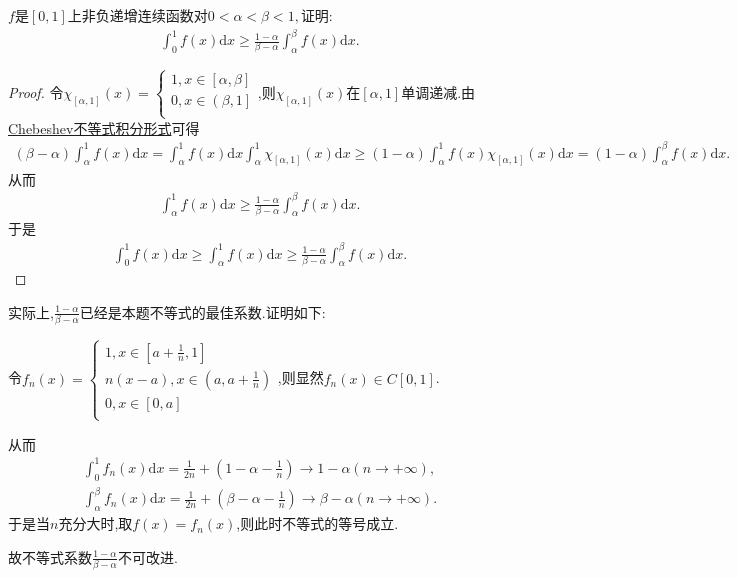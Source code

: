 \documentclass[../../main.tex]{subfiles}%
\begin{document}
\begin{example}
$f$是$[0,1]$上非负递增连续函数对$0 < \alpha < \beta < 1,$证明:
\begin{gather}
\int_{0}^{1} f(x) \mathrm{d}x \geqslant  \frac{1 - \alpha}{\beta - \alpha} \int_{\alpha}^{\beta} f(x) \mathrm{d}x.
\nonumber
\end{gather}
\end{example}
\begin{proof}
令$\chi _{\left[ \alpha ,1 \right]}\left( x \right) =\begin{cases}
1,x\in \left[ \alpha ,\beta \right]\\
0,x\in \left( \beta ,1 \right]\\
\end{cases}$,则$\chi _{\left[ \alpha ,1 \right]}\left( x \right)$在$[\alpha,1]$单调递减.由\hyperref[Basis of Analytics-Chebeshev不等式积分形式]{Chebeshev不等式积分形式}可得
\begin{align*}
\left( \beta -\alpha \right) \int_{\alpha}^1{f(x)\mathrm{d}x}=\int_{\alpha}^1{f(x)\mathrm{d}x\int_{\alpha}^1{\chi _{\left[ \alpha ,1 \right]}\left( x \right) \mathrm{d}x}}\geqslant \left( 1-\alpha \right) \int_{\alpha}^1{f\left( x \right) \chi _{\left[ \alpha ,1 \right]}\left( x \right) \mathrm{d}x}=\left( 1-\alpha \right) \int_{\alpha}^{\beta}{f\left( x \right) \mathrm{d}x}.
\nonumber
\end{align*}
从而
\begin{align*}
\int_{\alpha}^1{f(x)\mathrm{d}x}\geqslant \frac{1-\alpha}{\beta -\alpha}\int_{\alpha}^{\beta}{f\left( x \right) \mathrm{d}x}.
\nonumber
\end{align*}
于是
\begin{align*}
\int_0^1{f(x)\mathrm{d}x}\geqslant \int_{\alpha}^1{f(x)\mathrm{d}x}\geqslant \frac{1-\alpha}{\beta -\alpha}\int_{\alpha}^{\beta}{f\left( x \right) \mathrm{d}x}.
\nonumber
\end{align*}
\end{proof}
\begin{remark}
实际上,$\frac{1-\alpha}{\beta -\alpha}$已经是本题不等式的最佳系数.证明如下:

令$f_n\left( x \right) =\begin{cases}
1,x\in \left[ a+\frac{1}{n},1 \right]\\
n\left( x-a \right) ,x\in \left( a,a+\frac{1}{n} \right)\\
0,x\in \left[ 0,a \right]\\
\end{cases}$,则显然$f_n(x)\in C[0,1]$.

从而
\begin{align*}
\int_0^1{f_n\left( x \right) \mathrm{d}x}=\frac{1}{2n}+\left( 1-\alpha -\frac{1}{n} \right) \rightarrow 1-\alpha \left( n\rightarrow +\infty \right) ,
\\
\int_{\alpha}^{\beta}{f_n\left( x \right) \mathrm{d}x}=\frac{1}{2n}+\left( \beta -\alpha -\frac{1}{n} \right) \rightarrow \beta -\alpha \left( n\rightarrow +\infty \right) .
\nonumber
\end{align*}
于是当$n$充分大时,取$f(x)=f_n(x)$,则此时不等式的等号成立.

故不等式系数$\frac{1-\alpha}{\beta -\alpha}$不可改进.
\end{remark}
\end{document}
